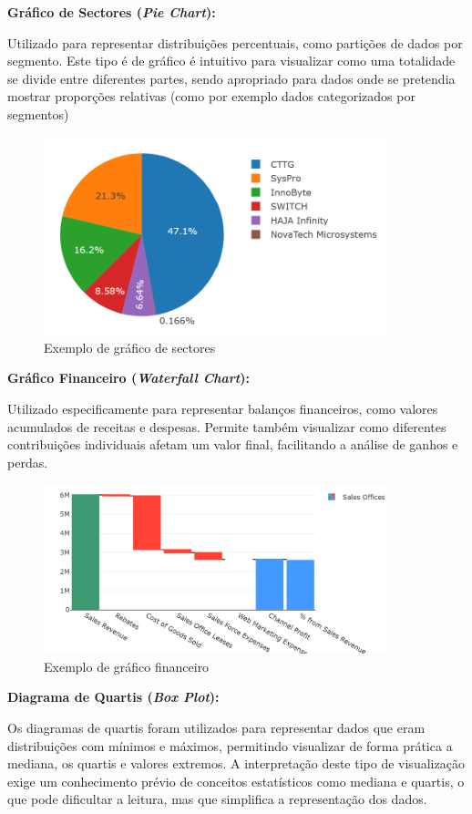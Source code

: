 \textbf{Gráfico de Sectores (\textit{Pie Chart}):}  

Utilizado para representar distribuições percentuais, como partições de dados por segmento. Este tipo é de gráfico é intuitivo para visualizar como uma totalidade se divide entre diferentes partes, sendo apropriado para dados onde se pretendia mostrar proporções relativas (como por exemplo dados categorizados por segmentos)

\begin{figure}[H]
    \centering
    \includegraphics[max width=10cm]{./img/pie}
    \caption{Exemplo de gráfico de sectores}
\end{figure}

\textbf{Gráfico Financeiro (\textit{Waterfall Chart}):}  

Utilizado especificamente para representar balanços financeiros, como valores acumulados de receitas e despesas. Permite também visualizar como diferentes contribuições individuais afetam um valor final, facilitando a análise de ganhos e perdas.

\begin{figure}[H]
    \centering
    \includegraphics[max width=10cm]{./img/waterfall}
    \caption{Exemplo de gráfico financeiro}
\end{figure}

\textbf{Diagrama de Quartis (\textit{Box Plot}):}

Os diagramas de quartis foram utilizados para representar dados que eram distribuições com mínimos e máximos, permitindo visualizar de forma prática a mediana, os quartis e valores extremos.  A interpretação deste tipo de visualização exige um conhecimento prévio de conceitos estatísticos como mediana e quartis, o que pode dificultar a leitura, mas que simplifica a representação dos dados.

